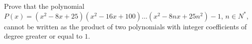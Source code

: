 Prove that the polynomial $P (x) = (x^2- 8x + 25) (x^2 - 16x + 100) ... (x^2 - 8nx + 25n^2)- 1$, $n \in N^*$,
cannot be written as the product of two polynomials with integer coefficients of degree greater or equal to $1$.